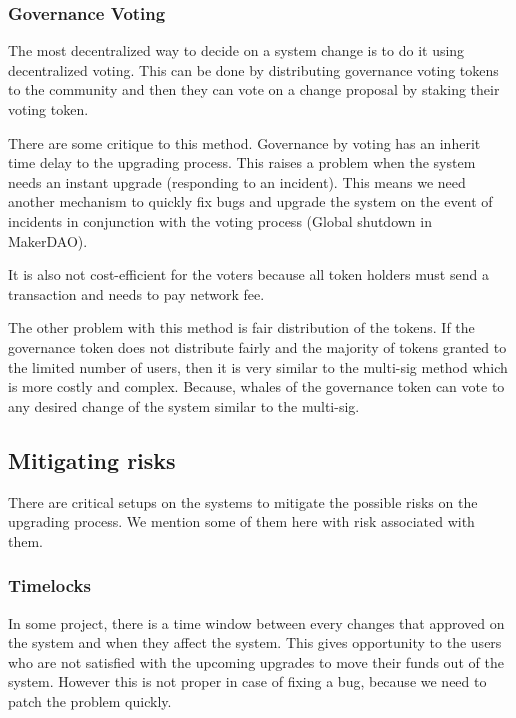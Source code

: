 \subsubsection{Governance Voting}
The most decentralized way to decide on a system change is to do it using decentralized voting. This can be done by distributing governance voting tokens to the community and then they can vote on a change proposal by staking their voting token. 

There are some critique to this method. Governance by voting has an inherit time delay to the upgrading process. This raises a problem when the system needs an instant upgrade (\eg responding to an incident). This means we need another mechanism to quickly fix bugs and upgrade the system on the event of incidents in conjunction with the voting process (\eg Global shutdown in MakerDAO).

It is also not cost-efficient for the voters because all token holders must send a transaction and needs to pay network fee.

The other problem with this method is fair distribution of the tokens. If the governance token does not distribute fairly and the majority of tokens granted to the limited number of users, then it is very similar to the multi-sig method which is more costly and complex. Because, whales of the governance token can vote to any desired change of the system similar to the multi-sig.
 

\subsection{Mitigating risks}
There are critical setups on the systems to mitigate the possible risks on the upgrading process. We mention some of them here with risk associated with them.

\subsubsection{Timelocks}
In some project, there is a time window between every changes that approved on the system and when they affect the system. This gives opportunity to the users who are not satisfied with the upcoming upgrades to move their funds out of the system. However this is not proper in case of fixing a bug, because we need to patch the problem quickly.

